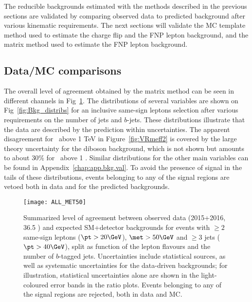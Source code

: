 The reducible backgrounds estimated with the methods described in the previous 
sections are validated by comparing observed data to 
predicted background after various kinematic requirements. 
The next sections will validate 
the MC template method used to estimate the charge flip and the FNP lepton 
background, and the matrix method used to estimate the FNP lepton background.



\subsection*{Data/MC comparisons}

The overall level of agreement obtained by the matrix method
can be seen in different channels in Fig~\ref{fig:distributions_summary}. 
The distributions of several variables are shown on Fig~\ref{fig:Bkg_distribs} for an inclusive same-sign leptons selection
after various requirements on the number of jets and $b$-jets.
These distributions illustrate that the data are described by the prediction 
within uncertainties. 
The apparent disagreement 
for \meff\ above 1 TeV in Figure~\ref{fig:VRmeff2} is covered by the large 
theory uncertainty for the diboson background, which is not shown 
but amounts to about 30\% for \meff\ above 1 \TeV. 
Similar distributions for the other main variables can be found in 
Appendix~\ref{chap:app.bkg.val}.
To avoid the presence of signal in the tails of these distributions, 
events belonging to any of the signal regions are vetoed 
both in data and for the predicted backgrounds. 

\begin{figure}[t!]
\centering
\texttt{[image: ALL\_MET50]}
\caption{Summarized level of agreement between observed data (2015+2016, 36.5 \ifb) and expected SM+detector backgrounds 
for events with $\ge 2$ same-sign leptons ($\pt>20 \GeV$), $\met>50 \GeV$ and $\ge 3$ jets ($\pt>40 \GeV$), 
split as function of the lepton flavours and the number of $b$-tagged jets. 
Uncertainties include statistical sources, as well as systematic uncertainties for the data-driven backgrounds; 
for illustration, statistical uncertainties alone are shown in the light-coloured error bands in the ratio plots. 
Events belonging to any of the signal regions are rejected, both in data and MC. 
}
\label{fig:distributions_summary}
\end{figure} 

